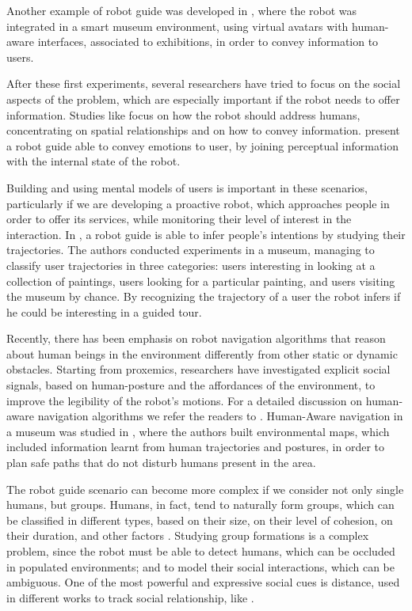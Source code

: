  Another example of robot guide was developed in \cite{bueno2011autonomous}, where the robot was integrated  in a smart museum environment, using virtual avatars with human-aware interfaces, associated to exhibitions, in order to convey information to users. 

 After these first experiments, several researchers have tried to focus on the social aspects of the problem, which are especially important if the robot needs to offer information. Studies like \cite{yousuf2012development,evers2014development} focus on how the robot should address humans, concentrating on spatial relationships and on how to convey information.  \cite{Jensen2005} present a robot guide able to convey emotions to user, by joining perceptual information with the internal state of the robot. 

Building and using mental models of users is important in these scenarios, particularly if we are developing a proactive robot, which approaches people in order to offer its services, while monitoring their level of interest in the interaction.  In \cite{rashed2015toward}, a robot guide is able to infer people's intentions by studying their trajectories. The authors conducted experiments in a museum, managing to classify user trajectories in three categories: users interesting in looking at a collection of paintings, users looking for a particular painting, and users visiting the museum by chance. By recognizing the trajectory of a user the robot infers if he could be interesting in a guided tour.

Recently, there has been emphasis on robot navigation algorithms that reason about human beings in the environment differently from other static or dynamic obstacles. Starting from proxemics, researchers have investigated explicit social signals, based on human-posture and the affordances of the environment, to improve the legibility of the robot's motions. For a detailed discussion on human-aware navigation algorithms we refer the readers to \cite{kruse2013human,rios-ijsr-2014}. Human-Aware navigation in a museum  was studied in \cite{samejima2015building}, where the authors built environmental maps, which included information learnt from human trajectories and postures, in order to plan safe paths that do not disturb humans present in the area. 

The robot guide scenario can become more complex if we consider not only single humans, but groups. Humans, in fact, tend to naturally form groups, which can be classified in different types, based on their size, on their level of cohesion, on their duration, and other factors \citep{forsyth2009group}.  Studying group formations is a complex problem, since the robot must be able to detect humans, which can be occluded in populated environments; and to model their social interactions, which can be ambiguous. One of the most powerful and expressive social cues is distance, used in different works to track social relationship, like \cite{luber2013multi}. 

